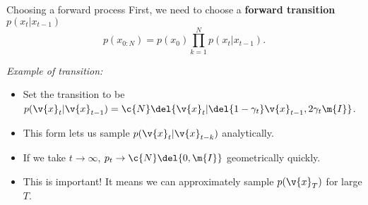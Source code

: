 \begin{frame}{Choosing a forward process}
    First, we need to choose a \textbf{forward transition}
    $p(x_{t}|x_{t-1})$ %
    \begin{equation}\label{eq:forward_markov}
         p(x_{0:N}) = p(x_0) \prod_{k=1}^{N} p(x_{t}|x_{t-1}).
    \end{equation}
    
    \textit{Example of transition:}
    \begin{itemize}
        \item Set the transition to be $p(\v{x}_t | \v{x}_{t-1}) = \c{N}\del{\v{x}_{t}| \del{1 - \gamma_t} \v{x}_{t-1}, 2\gamma_t \m{I}}$.
        \item This form lets us sample $p(\v{x}_t | \v{x}_{t-k})$ analytically. 
        \item If we take $t \to \infty$, $p_t \to \c{N}\del{0, \m{I}}$ geometrically quickly.
        \item This is important! It means we can approximately sample $p(\v{x}_T)$ for large $T$.
    \end{itemize}
\end{frame}


